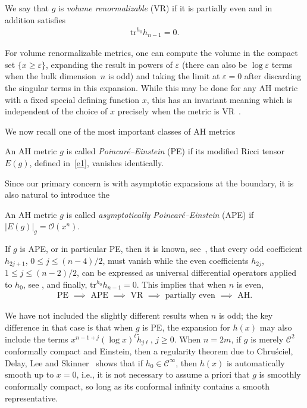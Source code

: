 \documentclass[11pt]{article}
\numberwithin{equation}{section}
\renewcommand{\epsilon}{\varepsilon}
\newcommand{\calO}{\mathcal O}
\newcommand{\calC}{\mathcal C}
\newcommand{\e}{\epsilon}
\newcommand{\tr}{\mathrm{tr}}
\begin{document}
\begin{Definition}\label{definition1.2}We say that $g$ is \emph{volume renormalizable} (VR) if it is partially even and in addition satisfies
\begin{gather*}%
\tr^{h_0} h_{n-1} = 0.
\end{gather*}
\end{Definition}

For volume renormalizable metrics, one can compute the volume in the compact set $\{x \geq \e\}$, expanding the result in powers of $\epsilon$ (there can also be $\log \epsilon$ terms when the bulk dimen\-sion~$n$ is odd) and taking the limit at $\e = 0$ after discarding the singular terms in this expansion. While this may be done for any AH metric with a fixed special defining function $x$, this has an invariant meaning which is independent of the choice of $x$ precisely when the metric is VR~\cite{Gr}.

We now recall one of the most important classes of AH metrics
\begin{Definition}\label{definition1.3} An AH metric $g$ is called \emph{Poincar\'e--Einstein} (PE) if its modified Ricci tensor~$E(g)$, defined in~\eqref{e1}, vanishes identically.
\end{Definition}
Since our primary concern is with asymptotic expansions at the boundary, it is also natural to introduce the
\begin{Definition}\label{definition1.4}
An AH metric $g$ is called \emph{asymptotically Poincar\'e--Einstein} (APE) if $|E(g)|_{g} = \calO( x^n)$.
\end{Definition}

If $g$ is APE, or in particular PE, then it is known, see~\cite{FG2}, that every odd coefficient $h_{2j+1}$, $0 \leq j \leq (n-4)/2$, must
vanish while the even coefficients $h_{2j}$, $1 \leq j \leq (n-2)/2$, can be expressed as universal differential operators applied
to $h_0$, see \cite{FG2}, and finally, $\tr^{h_0} h_{n-1} = 0$. This implies that when $n$ is even,
\begin{gather*}
	\text{PE $\implies$ APE $\implies$ VR $\implies$ partially even $\implies$ AH.}
\end{gather*}

We have not included the slightly different results when $n$ is odd; the key difference in that case is that when $g$ is PE, the expansion for $h(x)$ may also include the terms $x^{n-1+j} (\log x)^\ell \tilde{h}_{j\ell}$, $j \geq 0$. When $n=2m$, if $g$ is merely $\calC^2$ conformally compact and Einstein, then a regularity theorem due to Chru\'sciel, Delay, Lee and Skinner~\cite{CDLS} shows that if $h_0 \in \calC^\infty$, then $h(x)$ is automatically smooth up to $x=0$, i.e., it is not necessary to assume a priori that $g$ is smoothly conformally compact, so long as its conformal infinity contains a smooth representative.
\end{document}
